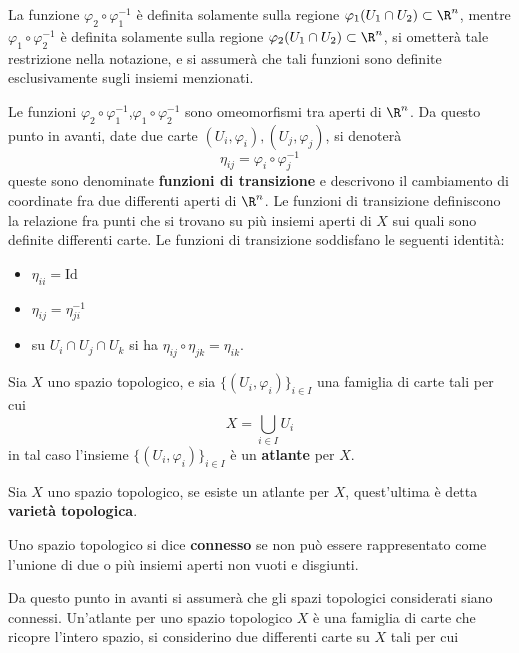 \documentclass[10pt, letterpaper]{report}
\begin{document}
La funzione $\varphi_2\circ\varphi_1^{-1}$ è definita solamente sulla regione $\varphi_1(U_1\cap U_2)\subset\R^n$, mentre $\varphi_1\circ\varphi_2^{-1}$ è definita solamente sulla regione $\varphi_2(U_1\cap U_2)\subset\R^n$, si ometterà tale restrizione nella notazione, e si assumerà che tali funzioni sono definite esclusivamente sugli insiemi menzionati.\bigskip

\noindent 
Le funzioni $\varphi_2\circ\varphi_1^{-1}$,$\varphi_1\circ\varphi_2^{-1}$ sono omeomorfismi tra aperti di $\R^n$. Da questo punto in avanti, date due carte $(U_i,\varphi_i),(U_j,\varphi_j)$, si denoterà\begin{equation}
    \eta_{ij}=\varphi_i\circ\varphi_j^{-1}
\end{equation}
queste sono denominate \textbf{funzioni di transizione} e descrivono il cambiamento di coordinate fra due differenti aperti di $\R^n$. Le funzioni di transizione definiscono la relazione fra punti che si trovano su più insiemi aperti di $X$ sui quali sono definite differenti carte. Le funzioni di transizione soddisfano le seguenti identità:\begin{itemize}
    \item $\eta_{ii}=\text{Id}$
    \item $\eta_{ij}=\eta_{ji}^{-1}$
    \item su $U_i\cap U_j\cap U_k$ si ha $\eta_{ij}\circ\eta_{jk}=\eta_{ik}$.
\end{itemize}
\begin{definizione}
    Sia $X$ uno spazio topologico, e sia $\{(U_i,\varphi_i)\}_{i\in I}$ una famiglia di carte tali per cui \begin{equation}
         X=\bigcup_{i\in I}U_i
    \end{equation}
    in tal caso l'insieme $\{(U_i,\varphi_i)\}_{i\in I}$ è un \textbf{atlante} per $X$.
\end{definizione}
\begin{definizione}
     Sia $X$ uno spazio topologico, se esiste un atlante per $X$, quest'ultima è detta \textbf{varietà topologica}.
\end{definizione}
\begin{definizione}
    Uno spazio topologico si dice \textbf{connesso} se non può essere rappresentato come l'unione di due o più insiemi aperti non vuoti e disgiunti.
\end{definizione}
Da questo punto in avanti si assumerà che gli spazi topologici considerati siano connessi.
Un'atlante per uno spazio topologico $X$ è una famiglia di carte che ricopre l'intero spazio, si considerino due differenti carte su $X$ tali per cui 
\end{document}
